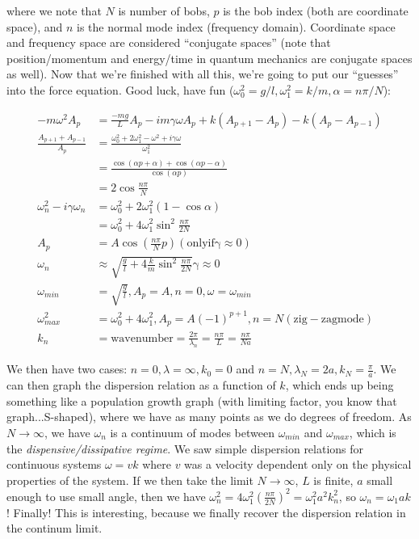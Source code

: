 \documentclass{report}
\begin{document}
where we note that $N$ is number of bobs, $p$ is the bob index (both are coordinate space), and $n$ is the normal mode index (frequency domain). Coordinate space and frequency space are considered ``conjugate spaces'' (note that position/momentum and energy/time in quantum mechanics are conjugate spaces as well). Now that we're finished with all this, we're going to put our ``guesses'' into the force equation. Good luck, have fun ($\omega_0^2 = g/l, \omega_1^2 = k/m, \alpha = n\pi/N$):

\begin{align*}
-m \omega^2 A_p &= \frac{-mg}{L}A_p - im\gamma\omega A_p + k(A_{p+1} - A_p) - k(A_p - A_{p-1})\\
\frac{A_{p+1} + A_{p-1}}{A_p} &= \frac{\omega_0^2+ 2\omega_1^2 - \omega^2 + i\gamma\omega}{\omega_1^2}\\
&= \frac{\cos(\alpha p + \alpha) + \cos(\alpha p - \alpha)}{\cos(\alpha p)}\\
&= 2\cos\frac{n\pi}{N}\\
\omega_n^2 - i\gamma\omega_n &= \omega_0^2 + 2\omega_1^2(1-\cos\alpha)\\
&= \omega_0^2 + 4\omega_1^2\sin^2\frac{n\pi}{2N}\\
A_p &= A\cos\left(\frac{n\pi}{N}p\right) \mathrm{(only if \gamma \approx 0)}\\
\omega_n & \approx \sqrt{\frac{g}{l} + 4\frac{k}{m}\sin^2\frac{n\pi}{2N}} \mathrm{\gamma \approx 0}\\
\omega_{min} &= \sqrt{\frac{g}{l}}, A_p = A, n=0, \omega = \omega_{min}\\
\omega_{max}^2 &= \omega_0^2 + 4\omega_1^2, A_p = A(-1)^{p+1}, n = N \mathrm{(zig-zag mode)}\\
k_n &= \mathrm{wavenumber} = \frac{2\pi}{\lambda_n} = \frac{n\pi}{L} = \frac{n\pi}{Na}
\end{align*}

We then have two cases: $n=0, \lambda = \infty, k_0 = 0$ and $n = N, \lambda_N = 2a, k_N = \frac{\pi}{a}$. We can then graph the dispersion relation as a function of $k$, which ends up being something like a population growth graph (with limiting factor, you know that graph...S-shaped), where we have as many points as we do degrees of freedom. As $N \to\infty$, we have $\omega_n$ is a continuum of modes between $\omega_{min}$ and $\omega_{max}$, which is the \emph{dispensive/dissipative regime}. We saw simple dispersion relations for continuous systems $\omega = vk$ where $v$ was a velocity dependent only on the physical properties of the system. If we then take the limit $N \to\infty$, $L$ is finite, $a$ small enough to use small angle, then we have $\omega_n^2 = 4\omega_1^2\left(\frac{n\pi}{2N}\right)^2 = \omega_1^2a^2k_n^2$, so $\omega_n = \omega_1ak$! Finally! This is interesting, because we finally recover the dispersion relation in the continum limit.
\end{document}
